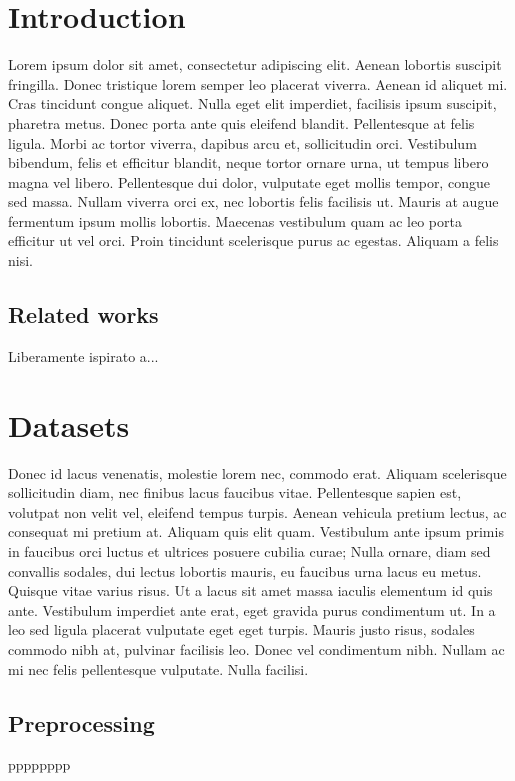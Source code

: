 \documentclass[a4paper]{report}
\begin{document}
\tableofcontents
\newpage

\setlength{\parskip}{1em}

\chapter{Introduction}
Lorem ipsum dolor sit amet, consectetur adipiscing elit. Aenean lobortis suscipit fringilla. Donec tristique lorem semper leo placerat viverra. Aenean id aliquet mi. Cras tincidunt congue aliquet. Nulla eget elit imperdiet, facilisis ipsum suscipit, pharetra metus. Donec porta ante quis eleifend blandit. Pellentesque at felis ligula. Morbi ac tortor viverra, dapibus arcu et, sollicitudin orci. Vestibulum bibendum, felis et efficitur blandit, neque tortor ornare urna, ut tempus libero magna vel libero. Pellentesque dui dolor, vulputate eget mollis tempor, congue sed massa. Nullam viverra orci ex, nec lobortis felis facilisis ut. Mauris at augue fermentum ipsum mollis lobortis. Maecenas vestibulum quam ac leo porta efficitur ut vel orci. Proin tincidunt scelerisque purus ac egestas. Aliquam a felis nisi.
\section{Related works}
Liberamente ispirato a...

\chapter{Datasets}
Donec id lacus venenatis, molestie lorem nec, commodo erat. Aliquam scelerisque sollicitudin diam, nec finibus lacus faucibus vitae. Pellentesque sapien est, volutpat non velit vel, eleifend tempus turpis. Aenean vehicula pretium lectus, ac consequat mi pretium at. Aliquam quis elit quam. Vestibulum ante ipsum primis in faucibus orci luctus et ultrices posuere cubilia curae; Nulla ornare, diam sed convallis sodales, dui lectus lobortis mauris, eu faucibus urna lacus eu metus. Quisque vitae varius risus. Ut a lacus sit amet massa iaculis elementum id quis ante. Vestibulum imperdiet ante erat, eget gravida purus condimentum ut. In a leo sed ligula placerat vulputate eget eget turpis. Mauris justo risus, sodales commodo nibh at, pulvinar facilisis leo. Donec vel condimentum nibh. Nullam ac mi nec felis pellentesque vulputate. Nulla facilisi.
\section{Preprocessing}
pppppppp
\end{document}
